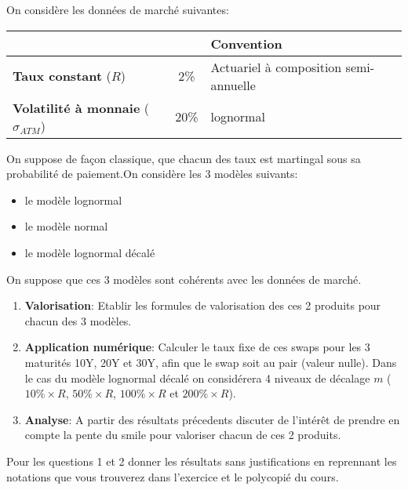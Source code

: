 \documentclass{article}
\begin{document}
\vspace{0.5cm}

On considère les données de marché suivantes:\\
\begin{tabular}{|l|c|l|}
\hline
&&\textbf{Convention}\\
\hline
\textbf{Taux constant} ($R$) & 2\%&Actuariel à composition semi-annuelle\\
\hline
\textbf{Volatilité à monnaie} ($\sigma_{ATM}$)&20\%&lognormal \\
\hline
\end{tabular}

\vspace{0.5cm}

On suppose de façon classique, que chacun des taux est martingal sous sa probabilité de paiement.On considère les 3 modèles suivants:
\begin{itemize}
\item le modèle lognormal
\item le modèle normal
\item le modèle lognormal décalé
\end{itemize}
\vspace{0.5cm}
On suppose que ces 3 modèles sont cohérents avec les données de marché.
\begin{enumerate}
\item \textbf{Valorisation}: Etablir les formules de valorisation des ces 2 produits pour chacun des 3 modèles.
\item \textbf{Application numérique}: Calculer le taux fixe de ces swaps pour les 3 maturités 10Y, 20Y et 30Y, afin que le swap soit au pair (valeur nulle). Dans le cas du modèle lognormal décalé on considérera 4 niveaux de décalage $m$ ($10\% \times R$, $50\% \times R$, $100\% \times R$ et $200\% \times R$).
\item \textbf{Analyse}: A partir des résultats précedents discuter de l'intérêt de prendre en compte la pente du smile pour valoriser chacun de ces 2 produits. 
\end{enumerate}
Pour les questions 1 et 2 donner les résultats sans justifications en reprennant les notations que vous trouverez dans l'exercice et le polycopié du cours.
\end{document}
